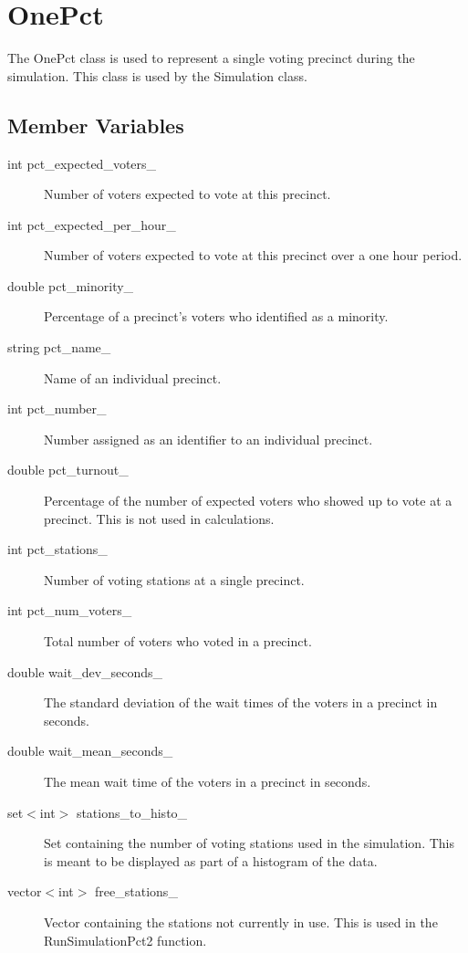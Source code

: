 %

\chapter{OnePct}
The OnePct class is used to represent a single voting precinct during the simulation.
This class is used by the Simulation class.

\section{Member Variables}

\begin{description}
\item[int pct\_expected\_voters\_] Number of voters expected to vote at this precinct.
\item[int pct\_expected\_per\_hour\_] Number of voters expected to vote at this precinct over a one hour period.
\item[double pct\_minority\_] Percentage of a precinct's voters who identified as a minority.
\item[string pct\_name\_] Name of an individual precinct.
\item[int pct\_number\_] Number assigned as an identifier to an individual precinct.
\item[double pct\_turnout\_] Percentage of the number of expected voters who showed up to vote at a precinct.  This is not used in calculations.
\item[int pct\_stations\_] Number of voting stations at a single precinct.
\item[int pct\_num\_voters\_]  Total number of voters who voted in a precinct.
\item[double wait\_dev\_seconds\_] The standard deviation of the wait times of the voters in a precinct in seconds.
\item[double wait\_mean\_seconds\_] The mean wait time of the voters in a precinct in seconds.
\item[set$<$int$>$ stations\_to\_histo\_] Set containing the number of voting stations used in the simulation.  This is meant to be displayed as part of a histogram of the data.
\item[vector$<$int$>$ free\_stations\_] Vector containing the stations not currently in use.  This is used in the RunSimulationPct2 function.

\end{description}
